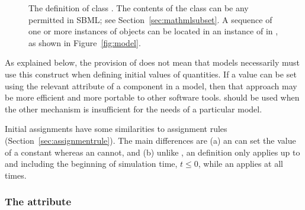 \begin{figure}[htb]
  \centering
  \small
  \vspace*{-1ex}
  \caption{The definition of class \InitialAssignment.  The
    contents of the  class can be any \mathml
    permitted in SBML; see
    Section~\protect\ref{sec:mathmlsubset}.  A
    sequence of one or more instances of \InitialAssignment
    objects can be located in an instance of
    \ListOfInitialAssignments in \Model, as shown in
    Figure~\protect\ref{fig:model}.}
  \label{fig:initialAssignment}
\end{figure}

As explained below, the provision of \InitialAssignment does not
mean that models necessarily must use this construct when defining
initial values of quantities.  If a value can be set
using the relevant attribute of a component in a model, then
that approach may be more efficient and more portable to other
software tools.  \InitialAssignment should be used when the other
mechanism is insufficient for the needs of a particular model.

Initial assignments have some similarities to assignment rules
(Section~\ref{sec:assignmentrule}).  The main differences are (a)
an \InitialAssignment can set the value of a constant whereas an
\AssignmentRule cannot, and (b) unlike \AssignmentRule, an
\InitialAssignment definition only applies up to and including the
beginning of simulation time, \ie $t \leq 0$, while an
\AssignmentRule applies at all times.


\subsubsection{The  attribute}


